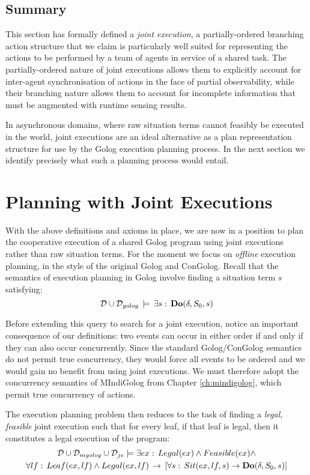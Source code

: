 \subsection{Summary}

This section has formally defined a \emph{joint execution}, a partially-ordered
branching action structure that we claim is particularly well suited
for representing the actions to be performed by a team of agents in
service of a shared task. The partially-ordered nature of joint executions
allows them to explicitly account for inter-agent synchronisation
of actions in the face of partial observability, while their branching
nature allows them to account for incomplete information that must
be augmented with runtime sensing results.

In asynchronous domains, where raw situation terms cannot feasibly
be executed in the world, joint executions are an ideal alternative
as a plan representation structure for use by the Golog execution
planning process. In the next section we identify precisely what such
a planning process would entail.


\section{Planning with Joint Executions\label{sec:JointExec:Planning}}

With the above definitions and axioms in place, we are now in a position
to plan the cooperative execution of a shared Golog program using
joint executions rather than raw situation terms. For the moment we
focus on \emph{offline} execution planning, in the style of the original
Golog and ConGolog. Recall that the semantics of execution planning
in Golog involve finding a situation term $s$ satisfying:\[
\mathcal{D}\cup\mathcal{D}_{golog}\,\models\,\exists s:\,\mathbf{Do}(\delta,S_{0},s)\]


Before extending this query to search for a joint execution, notice
an important consequence of our definitions: two events can occur
in either order if and only if they can also occur concurrently. Since
the standard Golog/ConGolog semantics do not permit true concurrency,
they would force all events to be ordered and we would gain no benefit
from using joint executions. We must therefore adopt the concurrency
semantics of MIndiGolog from Chapter \ref{ch:mindigolog}, which permit
true concurrency of actions.

The execution planning problem then reduces to the task of finding
a \emph{legal}, \emph{feasible} joint execution such that for every
leaf, if that leaf is legal, then it constitutes a legal execution
of the program:\begin{multline}
\mathcal{D}\cup\mathcal{D}_{mgolog}\cup\mathcal{D}_{je}\models\exists ex:\, Legal(ex)\wedge Feasible(ex)\wedge\\
\forall lf:\, Leaf(ex,lf)\wedge Legal(ex,lf)\,\rightarrow\,\left[\forall s:\, Sit(ex,lf,s)\rightarrow\mathbf{Do}(\delta,S_{0},s)\right]\label{eq:JE-Plan-Defn}\end{multline}


